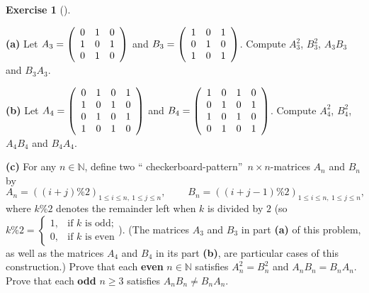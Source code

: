 \documentclass[numbers=enddot,12pt,final,onecolumn,notitlepage]{scrartcl}%
\theoremstyle{definition}
\newtheorem{exmp}[theo]{Exercise}
\newenvironment{exercise}[1][]
{\begin{exmp}[#1]\begin{leftbar}}
{\end{leftbar}\end{exmp}}
\begin{document}
\begin{exercise}
\label{exe.some-products.mt1p}\textbf{(a)} Let $A_{3}=\left(
\begin{array}
[c]{ccc}%
0 & 1 & 0\\
1 & 0 & 1\\
0 & 1 & 0
\end{array}
\right)  $ and $B_{3}=\left(
\begin{array}
[c]{ccc}%
1 & 0 & 1\\
0 & 1 & 0\\
1 & 0 & 1
\end{array}
\right)  $. Compute $A_{3}^{2}$, $B_{3}^{2}$, $A_{3}B_{3}$ and $B_{3}A_{3}$.

\textbf{(b)} Let $A_{4}=\left(
\begin{array}
[c]{cccc}%
0 & 1 & 0 & 1\\
1 & 0 & 1 & 0\\
0 & 1 & 0 & 1\\
1 & 0 & 1 & 0
\end{array}
\right)  $ and $B_{4}=\left(
\begin{array}
[c]{cccc}%
1 & 0 & 1 & 0\\
0 & 1 & 0 & 1\\
1 & 0 & 1 & 0\\
0 & 1 & 0 & 1
\end{array}
\right)  $. Compute $A_{4}^{2}$, $B_{4}^{2}$, $A_{4}B_{4}$ and $B_{4}A_{4}$.

\textbf{(c)} For any $n\in\mathbb{N}$, define two \textquotedblleft
checkerboard-pattern\textquotedblright\ $n\times n$-matrices $A_{n}$ and
$B_{n}$ by%
\[
A_{n}=\left(  \left(  i+j\right)  \%2\right)  _{1\leq i\leq n,\ 1\leq j\leq
n},\ \ \ \ \ \ \ \ \ \ B_{n}=\left(  \left(  i+j-1\right)  \%2\right)  _{1\leq
i\leq n,\ 1\leq j\leq n},
\]
where $k\%2$ denotes the remainder left when $k$ is divided by $2$ (so $k\%2=%
\begin{cases}
1, & \text{if }k\text{ is odd;}\\
0, & \text{if }k\text{ is even}%
\end{cases}
$). (The matrices $A_{3}$ and $B_{3}$ in part \textbf{(a)} of this problem, as
well as the matrices $A_{4}$ and $B_{4}$ in its part \textbf{(b)}, are
particular cases of this construction.) Prove that each \textbf{even}
$n\in\mathbb{N}$ satisfies $A_{n}^{2}=B_{n}^{2}$ and $A_{n}B_{n}=B_{n}A_{n}$.
Prove that each \textbf{odd} $n\geq3$ satisfies $A_{n}B_{n}\neq B_{n}A_{n}$.
\end{exercise}
\end{document}
